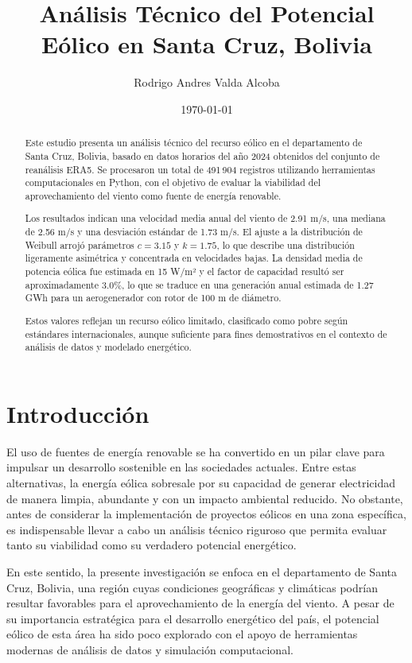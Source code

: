 \documentclass[a4paper,12pt]{article}
\title{\textbf{Análisis Técnico del Potencial Eólico en Santa Cruz, Bolivia}}
\author{Rodrigo Andres Valda Alcoba}
\date{\today}
\begin{document}
	
	\maketitle
	\begin{abstract}
			Este estudio presenta un análisis técnico del recurso eólico en el departamento de Santa Cruz, Bolivia, basado en datos horarios del año 2024 obtenidos del conjunto de reanálisis ERA5. Se procesaron un total de 491\,904 registros utilizando herramientas computacionales en Python, con el objetivo de evaluar la viabilidad del aprovechamiento del viento como fuente de energía renovable.
			
			Los resultados indican una velocidad media anual del viento de 2.91 m/s, una mediana de 2.56 m/s y una desviación estándar de 1.73 m/s. El ajuste a la distribución de Weibull arrojó parámetros \(c = 3.15\) y \(k = 1.75\), lo que describe una distribución ligeramente asimétrica y concentrada en velocidades bajas. La densidad media de potencia eólica fue estimada en 15 W/m² y el factor de capacidad resultó ser aproximadamente 3.0\%, lo que se traduce en una generación anual estimada de 1.27 GWh para un aerogenerador con rotor de 100 m de diámetro.
			
			Estos valores reflejan un recurso eólico limitado, clasificado como pobre según estándares internacionales, aunque suficiente para fines demostrativos en el contexto de análisis de datos y modelado energético.
		\end{abstract}
	
	\section{Introducción}
		El uso de fuentes de energía renovable se ha convertido en un pilar clave para impulsar un desarrollo sostenible en las sociedades actuales. Entre estas alternativas, la energía eólica sobresale por su capacidad de generar electricidad de manera limpia, abundante y con un impacto ambiental reducido. No obstante, antes de considerar la implementación de proyectos eólicos en una zona específica, es indispensable llevar a cabo un análisis técnico riguroso que permita evaluar tanto su viabilidad como su verdadero potencial energético.
		
		En este sentido, la presente investigación se enfoca en el departamento de Santa Cruz, Bolivia, una región cuyas condiciones geográficas y climáticas podrían resultar favorables para el aprovechamiento de la energía del viento. A pesar de su importancia estratégica para el desarrollo energético del país, el potencial eólico de esta área ha sido poco explorado con el apoyo de herramientas modernas de análisis de datos y simulación computacional.
		
\end{document}
